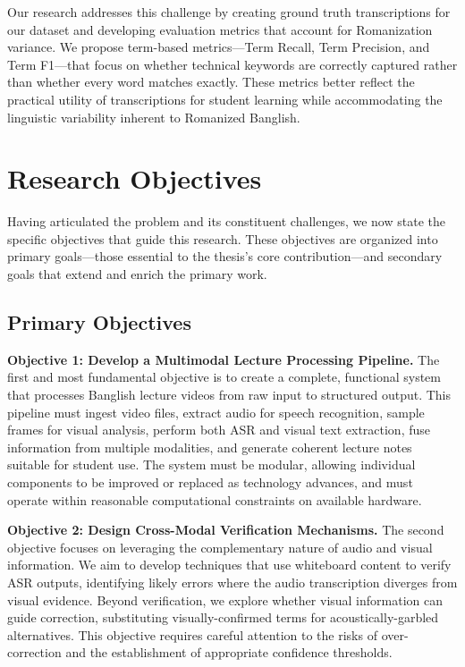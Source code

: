 Our research addresses this challenge by creating ground truth transcriptions for our dataset and developing evaluation metrics that account for Romanization variance. We propose term-based metrics---Term Recall, Term Precision, and Term F1---that focus on whether technical keywords are correctly captured rather than whether every word matches exactly. These metrics better reflect the practical utility of transcriptions for student learning while accommodating the linguistic variability inherent to Romanized Banglish.

\section{Research Objectives}

Having articulated the problem and its constituent challenges, we now state the specific objectives that guide this research. These objectives are organized into primary goals---those essential to the thesis's core contribution---and secondary goals that extend and enrich the primary work.

\subsection{Primary Objectives}

\textbf{Objective 1: Develop a Multimodal Lecture Processing Pipeline.} The first and most fundamental objective is to create a complete, functional system that processes Banglish lecture videos from raw input to structured output. This pipeline must ingest video files, extract audio for speech recognition, sample frames for visual analysis, perform both ASR and visual text extraction, fuse information from multiple modalities, and generate coherent lecture notes suitable for student use. The system must be modular, allowing individual components to be improved or replaced as technology advances, and must operate within reasonable computational constraints on available hardware.

\textbf{Objective 2: Design Cross-Modal Verification Mechanisms.} The second objective focuses on leveraging the complementary nature of audio and visual information. We aim to develop techniques that use whiteboard content to verify ASR outputs, identifying likely errors where the audio transcription diverges from visual evidence. Beyond verification, we explore whether visual information can guide correction, substituting visually-confirmed terms for acoustically-garbled alternatives. This objective requires careful attention to the risks of over-correction and the establishment of appropriate confidence thresholds.

